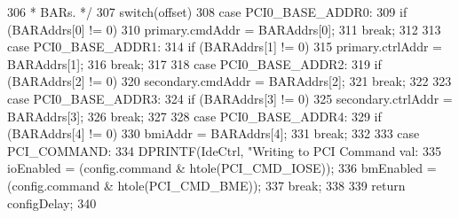 \begin{DoxyCode}
{306      * BARs. */
307     switch(offset) {
308       case PCI0_BASE_ADDR0:
309         if (BARAddrs[0] != 0)
310             primary.cmdAddr = BARAddrs[0];
311         break;
312 
313       case PCI0_BASE_ADDR1:
314         if (BARAddrs[1] != 0)
315             primary.ctrlAddr = BARAddrs[1];
316         break;
317 
318       case PCI0_BASE_ADDR2:
319         if (BARAddrs[2] != 0)
320             secondary.cmdAddr = BARAddrs[2];
321         break;
322 
323       case PCI0_BASE_ADDR3:
324         if (BARAddrs[3] != 0)
325             secondary.ctrlAddr = BARAddrs[3];
326         break;
327 
328       case PCI0_BASE_ADDR4:
329         if (BARAddrs[4] != 0)
330             bmiAddr = BARAddrs[4];
331         break;
332 
333       case PCI_COMMAND:
334         DPRINTF(IdeCtrl, "Writing to PCI Command val: %
335         ioEnabled = (config.command & htole(PCI_CMD_IOSE));
336         bmEnabled = (config.command & htole(PCI_CMD_BME));
337         break;
338     }
339     return configDelay;
340 }
\end{DoxyCode}


